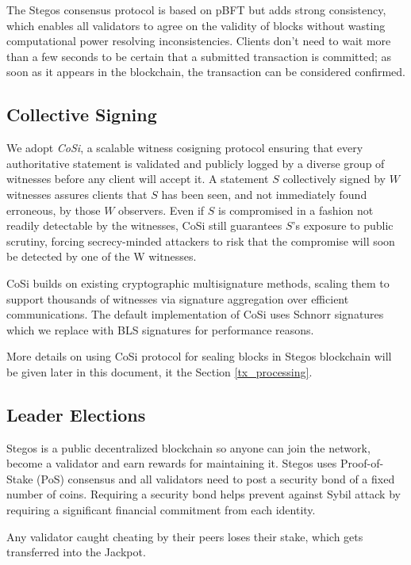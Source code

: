 \documentclass[a4paper, 10pt, conference]{ieeeconf}
\begin{document}
The Stegos consensus protocol is based on pBFT\cite{c9} but adds strong consistency, which enables all validators to agree on the validity of blocks without wasting computational power resolving inconsistencies. Clients don’t need to wait more than a few seconds to be certain that a submitted transaction is committed; as soon as it appears in the blockchain, the transaction can be considered confirmed. 

\subsection{Collective Signing}

We adopt \textit{CoSi}\cite{c10}\cite{c11}, a scalable witness cosigning protocol ensuring that every authoritative statement is validated and publicly logged by a diverse group of witnesses before any client will accept it. A statement $S$ collectively signed by $W$ witnesses assures clients that $S$ has been seen, and not immediately found erroneous, by those $W$ observers. Even if $S$ is compromised in a fashion not readily detectable by the witnesses, CoSi still guarantees $S$’s exposure to public scrutiny, forcing secrecy-minded attackers to risk that the compromise will soon be detected by one of the W witnesses. 

CoSi builds on existing cryptographic multisignature methods, scaling them to support thousands of witnesses via signature aggregation over efficient communications. The default implementation of CoSi uses Schnorr signatures which we replace with BLS signatures for performance reasons.

More details on using CoSi protocol for sealing blocks in Stegos blockchain will be given later in this document, it the Section \ref{tx_processing}.


\subsection{Leader Elections}

Stegos is a public decentralized blockchain so anyone can join the network, become a validator and earn rewards for maintaining it. Stegos uses Proof-of-Stake (PoS) consensus and all validators need to post a security bond of a fixed number of coins. Requiring a security bond helps prevent against Sybil attack by requiring a significant financial commitment from each identity.

Any validator caught cheating by their peers loses their stake, which gets transferred into the Jackpot. 
\end{document}

